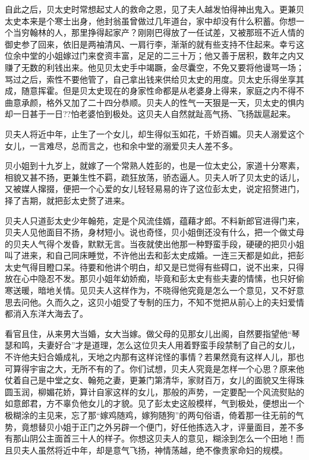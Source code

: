 \documentclass[12pt,UTF8]{ctexbook}
\begin{document}
{{{自此之后，贝太史时常想起丈人的救命之恩，见了夫人越发怕得神出鬼入。更兼贝太史本来是个寒士出身，他封翁虽曾做过几年道台，家中却没有什么积蓄。你想一个当穷翰林的人，那里挣得起家产？刚刚巴得放了一任试差，又被那班不近人情的御史参了回来，依旧是两袖清风、一肩行李，渐渐的就有些支持不住起来。幸亏这位余中堂的小姐嫁过门来奁资丰富，足足的二三十万；他又善于居积，数年之内又赚了无数的利钱出来。他见贝太史手中竭蹶，金尽囊空，不免又要将他谩骂一场；骂过之后，索性不要他管了，自己拿出钱来供给贝太史的用度。贝太史乐得坐享其成，随意挥霍。但是贝太史现在的身家性命都是从老婆身上得来，家庭之内不得不曲意承颜，格外又加了二十四分恭顺。贝夫人的性气一天狠是一天，贝太史的惧内却一日甚于一日??怕老婆怕到极处。这贝夫人自然就趾高气扬、飞扬跋扈起来。

贝夫人将近中年，止生了一个女儿，却生得似玉如花，千娇百媚。贝夫人溺爱这个女儿，一言难尽，总而言之，也和余中堂的溺爱贝夫人差不多。

贝小姐到十九岁上，就嫁了一个常熟人姓彭的，也是一位太史公，家道十分寒素，相貌又甚不扬，更兼生性不羁，疏狂放荡，骄态逼人。贝夫人听了贝太史的话儿，又被媒人撺掇，便把一个心爱的女儿轻轻易易的许了这位彭太史，说定招赘进门，择了吉期，就把彭太史赘了进来。

贝夫人只道彭太史少年翰苑，定是个风流佳婿，蕴藉才郎。不料新郎官进得门来，贝夫人见他面目不扬，身材短小。说也奇怪，贝小姐倒还没有什么，把一个做丈母的贝夫人气得个发昏，默默无言。当夜就使出他那一种野蛮手段，硬硬的把贝小姐叫了进来，和自己同床睡觉，不许他出去和彭太史成婚。一连三天都是如此，把彭太史气得目瞪口呆。待要和他讲个明白，却又是已觉得有些碍口，说不出来，只得放在心中隐忍不发。那贝小姐年幼娇痴，毕竟和彭太史有些夫妻的情愫，也只好偷寒送暖，暗地关情。见贝夫人这样作为，不晓得他究竟是怎么一个意见，又不好意思去问他。久而久之，这贝小姐受了专制的压力，不知不觉把从前心上的夫妇爱情都消入东洋大海去了。

看官且住，从来男大当婚，女大当嫁。做父母的见那女儿出阁，自然要指望他“琴瑟和鸣，夫妻好合”才是道理，怎么这位贝夫人用着野蛮手段禁制了自己的女儿，不许他夫妇合婚成礼，天地之内那有这样诧怪的事情？若果然竟有这样人儿，那也可算得宇宙之大，无所不有的了。你们试想，贝夫人究竟是怎样一个心思？原来他仗着自己是中堂之女、翰苑之妻，更兼门第清华，家财百万，女儿的面貌又生得珠圆玉润，柳媚花娇，算计自家这样的女儿，那般的声势，一定要配一个风流熨贴的如意郎君，方不辜负他女儿的才貌。见了彭太史这般模样，气到极处，便想出一个极糊涂的主见来，忘了那“嫁鸡随鸡，嫁狗随狗”的两句俗语，倚着那一往无前的气势，竟想替贝小姐于正门之外另辟一个便门，好任他拣选入才，评量面目，差不多有那山阴公主面首三十人的样子。你想这贝夫人的意见，糊涂到怎么一个田地！而且贝夫人虽然将近中年，却是意气飞扬，神情荡越，绝不像贵家命妇的规模。

}}}
\end{document}
